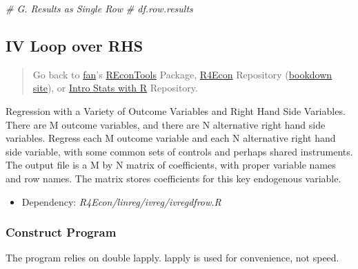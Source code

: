 \documentclass[
]{book}
\newenvironment{Shaded}{\begin{snugshade}}{\end{snugshade}}
\newcommand{\CommentTok}[1]{\textcolor[rgb]{0.56,0.35,0.01}{\textit{#1}}}
\providecommand{\tightlist}{%
  \setlength{\itemsep}{0pt}\setlength{\parskip}{0pt}}
\begin{document}
\begin{Shaded}
\begin{Highlighting}[]
\CommentTok{# G. Results as Single Row}
\CommentTok{# df.row.results}
\end{Highlighting}
\end{Shaded}

\begin{Shaded}
\end{Shaded}

\hypertarget{iv-loop-over-rhs}{%
\subsection{IV Loop over RHS}\label{iv-loop-over-rhs}}

\begin{quote}
Go back to \href{http://fanwangecon.github.io/}{fan}'s \href{https://fanwangecon.github.io/REconTools/}{REconTools} Package, \href{https://fanwangecon.github.io/R4Econ/}{R4Econ} Repository (\href{https://fanwangecon.github.io/R4Econ/bookdown}{bookdown site}), or \href{https://fanwangecon.github.io/Stat4Econ/}{Intro Stats with R} Repository.
\end{quote}

Regression with a Variety of Outcome Variables and Right Hand Side Variables. There are M outcome variables, and there are N alternative right hand side variables. Regress each M outcome variable and each N alternative right hand side variable, with some common sets of controls and perhaps shared instruments. The output file is a M by N matrix of coefficients, with proper variable names and row names. The matrix stores coefficients for this key endogenous variable.

\begin{itemize}
\tightlist
\item
  Dependency: \emph{R4Econ/linreg/ivreg/ivregdfrow.R}
\end{itemize}

\hypertarget{construct-program-1}{%
\subsubsection{Construct Program}\label{construct-program-1}}

The program relies on double lapply. lapply is used for convenience, not speed.
\end{document}
